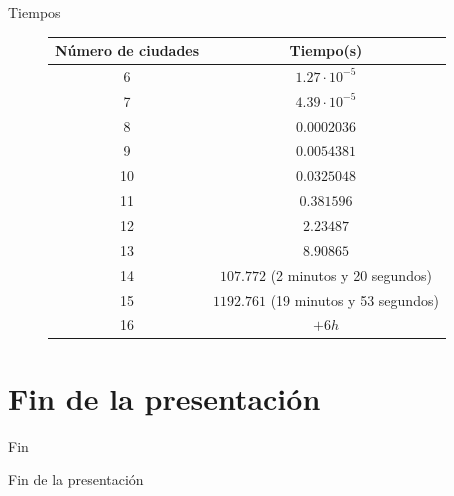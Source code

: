 \documentclass{beamer}
\begin{document}
\begin{frame}[fragile]{Tiempos}
\begin{figure}[H]
\centering
\begin{tabular}{|c|c|}
\hline
\textbf{Número de ciudades} & \textbf{Tiempo(s)}\\
\hline
6 & $1.27 \cdot 10^{-5}$\\
\hline
7 & $4.39 \cdot 10^{-5}$\\
\hline
8 & $0.0002036$\\
\hline
9 & $0.0054381$\\
\hline
10 & $0.0325048$\\
\hline
11 & $0.381596$\\
\hline
12 & $2.23487$\\
\hline
13 & $8.90865$\\
\hline
14 & $107.772$ (2 minutos y 20 segundos)\\
\hline
15 & $1192.761$ (19 minutos y 53 segundos)\\
\hline
16 & $+6h$\\
\hline
\end{tabular}
\end{figure}
\end{frame}

\section*{Fin de la presentación}

\begin{frame}{Fin}
\begin{center}
\huge{Fin de la presentación}
\end{center}
\end{frame}
\end{document}
